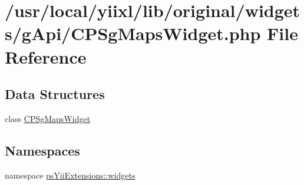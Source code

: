 \hypertarget{CPSgMapsWidget_8php}{
\section{/usr/local/yiixl/lib/original/widgets/gApi/CPSgMapsWidget.php File Reference}
\label{CPSgMapsWidget_8php}
}
\subsection*{Data Structures}
\begin{DoxyCompactItemize}
\item 
class \hyperlink{classCPSgMapsWidget}{CPSgMapsWidget}
\end{DoxyCompactItemize}
\subsection*{Namespaces}
\begin{DoxyCompactItemize}
\item 
namespace \hyperlink{namespacepsYiiExtensions_1_1widgets}{psYiiExtensions::widgets}
\end{DoxyCompactItemize}
